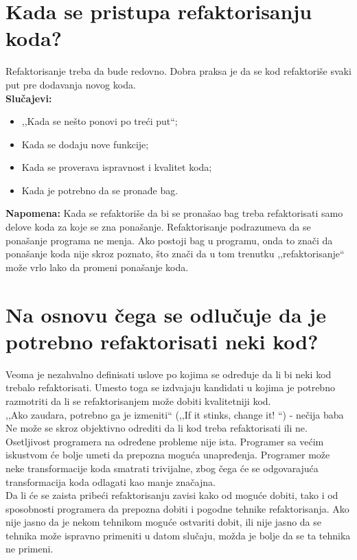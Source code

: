 \documentclass[a4paper]{article}
\begin{document}
\section{Kada se pristupa refaktorisanju koda?}
  Refaktorisanje treba da bude redovno. Dobra praksa je da se kod refaktoriše svaki put pre
  dodavanja novog koda. \\
  \textbf{Slučajevi:}
  \begin{itemize}
    \item ,,Kada se nešto ponovi po treći put``;
    \item Kada se dodaju nove funkcije;
    \item Kada se proverava ispravnost i kvalitet koda;
    \item Kada je potrebno da se pronađe bag. 
  \end{itemize}
  \textbf{Napomena:} Kada se refaktoriše da bi se pronašao bag treba refaktorisati samo delove koda
  za koje se zna ponašanje. Refaktorisanje podrazumeva da se ponašanje programa ne menja.
  Ako postoji bag u programu, onda to znači da ponašanje koda nije skroz poznato, što 
  znači da u tom trenutku ,,refaktorisanje`` može vrlo lako da promeni ponašanje koda.

\section{Na osnovu čega se odlučuje da je potrebno refaktorisati neki kod?}
  Veoma je nezahvalno definisati uslove po kojima se određuje da li bi neki kod trebalo refaktorisati.
  Umesto toga se izdvajaju kandidati u kojima je potrebno razmotriti da li se refaktorisanjem
  može dobiti kvalitetniji kod. \\

  ,,Ako zaudara, potrebno ga je izmeniti`` (,,If it stinks, change it! ``) - nečija baba \\

  Ne može se skroz objektivno odrediti da li kod treba refaktorisati ili ne. Osetljivost programera
  na određene probleme nije ista. Programer sa većim iskustvom će bolje umeti da prepozna
  moguća unapređenja. Programer može neke transformacije koda smatrati trivijalne, zbog čega
  će se odgovarajuća transformacija koda odlagati kao manje značajna.\\
  \indent Da li će se zaista pribeći refaktorisanju zavisi kako od moguće dobiti, tako i od sposobnosti 
  programera da prepozna dobiti i pogodne tehnike refaktorisanja. 
  Ako nije jasno da je nekom tehnikom moguće ostvariti dobit, 
  ili nije jasno da se tehnika može ispravno primeniti u datom slučaju, 
  možda je bolje da se ta tehnika ne primeni.
\end{document}
